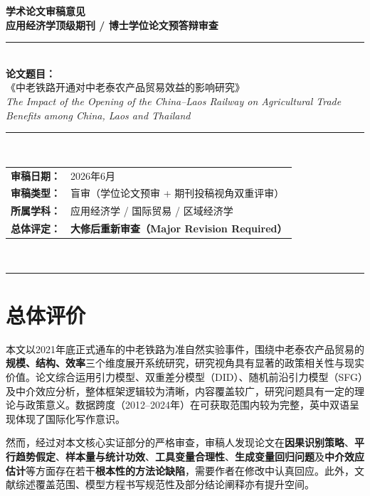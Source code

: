 \documentclass[12pt, a4paper]{article}
\begin{document}

\begin{center}
  {\LARGE\bfseries\color{sectionblue} 学术论文审稿意见}\\[0.8em]
  {\large\bfseries 应用经济学顶级期刊 / 博士学位论文预答辩审查}\\[1.5em]
  \rule{0.85\textwidth}{1.2pt}\\[0.5em]
  {\large\bfseries 论文题目：}\\[0.3em]
  {\large《中老铁路开通对中老泰农产品贸易效益的影响研究》}\\[0.3em]
  {\small\textit{The Impact of the Opening of the China--Laos Railway on Agricultural Trade Benefits among China, Laos and Thailand}}\\[1em]
  \rule{0.85\textwidth}{0.6pt}\\[0.5em]
  \begin{tabular}{ll}
    \textbf{审稿日期：} & 2026年6月 \\
    \textbf{审稿类型：} & 盲审（学位论文预审 + 期刊投稿视角双重评审）\\
    \textbf{所属学科：} & 应用经济学 / 国际贸易 / 区域经济学 \\
    \textbf{总体评定：} & \textcolor{majororange}{\textbf{大修后重新审查（Major Revision Required）}}\\
  \end{tabular}\\[1em]
  \rule{0.85\textwidth}{1.2pt}
\end{center}

\vspace{1em}

\section{总体评价}

\begin{positivebox}[研究选题与整体框架]
本文以2021年底正式通车的中老铁路为准自然实验事件，围绕中老泰农产品贸易的\textbf{规模、结构、效率}三个维度展开系统研究，研究视角具有显著的政策相关性与现实价值。论文综合运用引力模型、双重差分模型（DID）、随机前沿引力模型（SFG）及中介效应分析，整体框架逻辑较为清晰，内容覆盖较广，研究问题具有一定的理论与政策意义。数据跨度（2012--2024年）在可获取范围内较为完整，英中双语呈现体现了国际化写作意识。
\end{positivebox}

然而，经过对本文核心实证部分的严格审查，审稿人发现论文在\textbf{因果识别策略}、\textbf{平行趋势假定}、\textbf{样本量与统计功效}、\textbf{工具变量合理性}、\textbf{生成变量回归问题}及\textbf{中介效应估计}等方面存在若干\textbf{根本性的方法论缺陷}，需要作者在修改中认真回应。此外，文献综述覆盖范围、模型方程书写规范性及部分结论阐释亦有提升空间。
\end{document}
